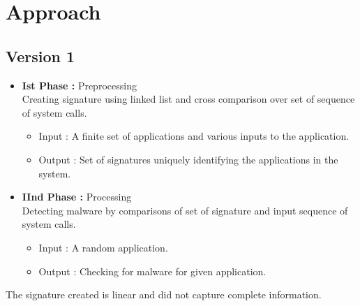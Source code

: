 \section{Approach}
\subsection{Version 1}
    \begin{itemize}
        \item[] \textbf{Ist Phase : } Preprocessing \\ Creating signature using linked list and cross comparison over set of sequence of system calls.
            \begin{itemize}
                \item[] Input : A finite set of applications and various inputs to the application.
                \item[] Output : Set of signatures uniquely identifying the applications in the system.
            \end{itemize}
        \item[] \textbf{IInd Phase : } Processing \\ Detecting malware by comparisons of set of signature and input sequence of system calls.
            \begin{itemize}
                \item[] Input : A random application.
                \item[] Output : Checking for malware for given application.
            \end{itemize}
    \end{itemize}

The signature created is linear and did not capture complete information.

